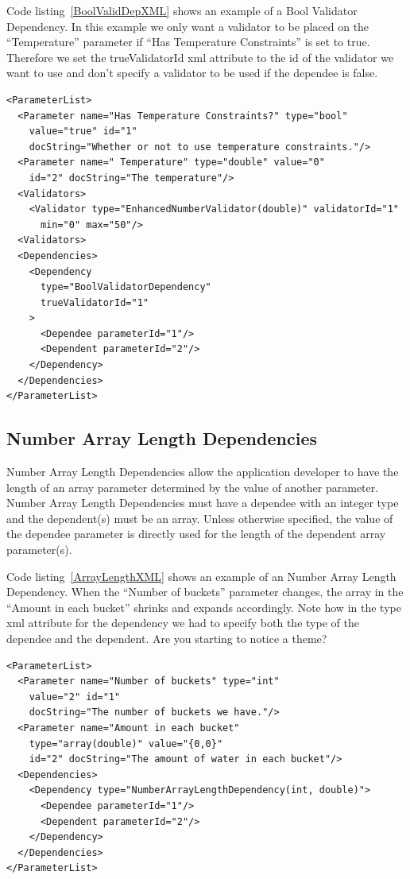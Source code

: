 Code listing~\ref{BoolValidDepXML} shows an example of a Bool Validator Dependency. In this example we only want a validator to be placed on the
``Temperature'' parameter if ``Has Temperature Constraints'' is set to true. Therefore we set the trueValidatorId xml attribute to the id of the
validator we want to use and don't specify a validator to be used if the dependee is false.
\begin{lstlisting}[caption={Example usage of a Bool Validator Dependency}, label=BoolValidDepXML]
<ParameterList>
  <Parameter name="Has Temperature Constraints?" type="bool" 
    value="true" id="1" 
    docString="Whether or not to use temperature constraints."/>
  <Parameter name=" Temperature" type="double" value="0"
    id="2" docString="The temperature"/>
  <Validators>
    <Validator type="EnhancedNumberValidator(double)" validatorId="1"
      min="0" max="50"/>
  <Validators>
  <Dependencies>
    <Dependency 
      type="BoolValidatorDependency" 
      trueValidatorId="1"
    >
      <Dependee parameterId="1"/>
      <Dependent parameterId="2"/>
    </Dependency>
  </Dependencies>
</ParameterList>
\end{lstlisting}

\subsection{Number Array Length Dependencies}
Number Array Length Dependencies allow the application developer to have the length of an array parameter determined by the value of another parameter. Number Array Length
Dependencies must have a dependee with an integer type and the dependent(s) must be an array. Unless otherwise specified, the value of the dependee parameter is directly
used for the length of the dependent array parameter(s). 

Code listing~\ref{ArrayLengthXML} shows an example of an Number Array Length Dependency. When the ``Number of buckets'' parameter changes, the array in the ``Amount
in each bucket'' shrinks and expands accordingly. Note how in the type xml attribute for the dependency we had to specify both the type of the dependee and the
dependent. Are you starting to notice a theme?
\begin{lstlisting}[caption={Example usage of a Number Array Length Dependency}, label=ArrayLengthXML]
<ParameterList>
  <Parameter name="Number of buckets" type="int"
    value="2" id="1" 
    docString="The number of buckets we have."/>
  <Parameter name="Amount in each bucket" 
    type="array(double)" value="{0,0}"
    id="2" docString="The amount of water in each bucket"/>
  <Dependencies>
    <Dependency type="NumberArrayLengthDependency(int, double)">
      <Dependee parameterId="1"/>
      <Dependent parameterId="2"/>
    </Dependency>
  </Dependencies>
</ParameterList>
\end{lstlisting}

